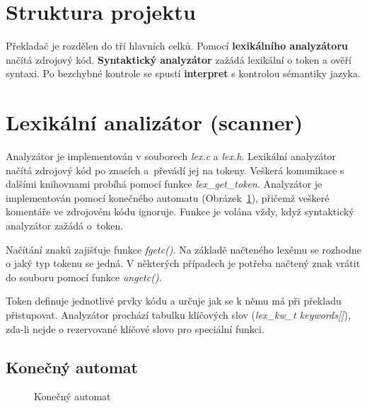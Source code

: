 \documentclass[a4paper, 11pt, titlepage]{article}
\begin{document}
\newpage

\section{Struktura projektu}
Překladač je rozdělen do tří hlavních celků. Pomocí \textbf{lexikálního analyzátoru} načítá zdrojový kód. \textbf{Syntaktický analyzátor} zažádá lexikální o token a ověří syntaxi. Po bezchybné kontrole se spustí \textbf{interpret} s kontrolou sémantiky jazyka.  

\section{Lexikální analizátor (scanner)}
Analyzátor je implementován v souborech \textit{lex.c} a \textit{lex.h}. Lexikální analyzátor načítá zdrojový kód po znacích a~převádí jej na tokeny. Veškerá komunikace s dalšími knihovnami probíhá pomocí funkce \textit{lex\_get\_token}. Analyzátor je implementován pomocí konečného automatu (Obrázek~\ref{picture_1:konecny_automat}), přičemž veškeré komentáře ve zdrojovém kódu ignoruje. Funkce je volána vždy, když syntaktický analyzátor zažádá o~token. 

Načítání znaků zajišťuje funkce \textit{fgetc()}. Na základě načteného lexému se rozhodne o jaký typ tokenu se jedná. V některých případech je potřeba načtený znak vrátit do souboru pomocí funkce \textit{ungetc()}.

Token definuje jednotlivé prvky kódu a určuje jak se k němu má při překladu přistupovat. Analyzátor prochází tabulku klíčových slov (\textit{lex\_kw\_t keywords[]}), zda-li nejde o rezervované klíčové slovo pro speciální funkci.

\subsection{Konečný automat}

\begin{figure}[h]
	\centering
	\caption{Konečný automat}
	\label{picture_1:konecny_automat}
\end{figure}
\end{document}

